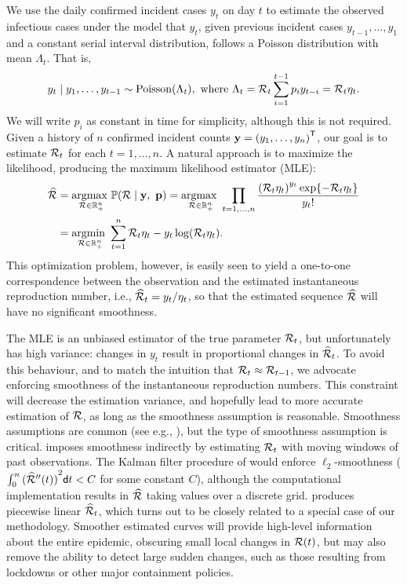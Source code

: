 We use the daily confirmed incident cases $y_t$ on day $t$ to estimate the
observed infectious cases under the model that $y_t$, given previous incident
cases $y_{t-1},\ldots,y_1$ and a constant serial interval distribution, follows a
Poisson distribution with mean $\Lambda_t$. That is, 
\begin{equation}
  y_t \mid y_1,\ldots,y_{t-1} \sim \mathrm{Poisson}(\Lambda_t), \textrm{ where } 
  \Lambda_t =  \mathcal{R}_t\sum_{i=1}^{t-1}p_i y_{t-i} = \mathcal{R}_t\eta_t.
\end{equation} 
We will write $p_i$ as constant in time for simplicity, although this is not
required. Given a history of $n$ confirmed incident counts $\mathbf{y} =
{(y_1,\ldots,y_n)}^{\mathsf{T}}$,
our goal is to estimate $\mathcal{R}_t$ for each $t=1,\ldots,n$. A natural approach is to maximize the
likelihood, producing the maximum likelihood estimator (MLE):
\begin{equation} \label{eq:mle}
  \begin{split}
    \widehat{\mathcal{R}} &= \underset{\mathcal{R} \in \mathbb{R}_+^n}{\operatorname*{argmax}\ } \mathbb{P}(\mathcal{R} \mid \mathbf{y},\ \mathbf{p})
    = \underset{\mathcal{R} \in \mathbb{R}^n_+}{\operatorname*{argmax}\ } \prod_{t = 1,\dots,n} 
    \frac{\left(\mathcal{R}_t \eta_t\right)^{y_t} \exp\{- \mathcal{R}_t \eta_t\}  }{y_t!}\\
    &= \underset{\mathcal{R}\in\mathbb{R}^n_+}{\operatorname*{argmin}\ } \sum_{t = 1}^n \mathcal{R}_t\eta_t - 
    y_t\log(\mathcal{R}_t\eta_t).
  \end{split}
\end{equation}
This optimization problem, however, is easily seen to yield a one-to-one
correspondence between the observation and the estimated instantaneous reproduction
number, i.e.,
$\widehat{\mathcal{R}}_t = y_t / \eta_t$, so that the estimated sequence
$\widehat{\mathcal{R}}$ will have no significant smoothness.


The MLE is an unbiased estimator of the true parameter $\mathcal{R}_t$, but
unfortunately has high variance: changes in $y_t$ result in proportional changes
in $\widehat{\mathcal{R}}_t$. To avoid this behaviour, and to match the intuition that
$\mathcal{R}_t \approx \mathcal{R}_{t-1}$, we advocate enforcing smoothness of the
instantaneous reproduction numbers. This constraint will decrease the estimation
variance, and hopefully lead to more accurate estimation of $\mathcal{R}$, as long as
the smoothness assumption is reasonable. Smoothness assumptions are common (see
e.g., \cite{gostic2020practical,parag2021improved}), but the type of smoothness
assumption is critical. \citet{cori2013new} imposes smoothness
indirectly by estimating $\mathcal{R}_t$ with moving windows of past observations. The
Kalman filter procedure of \cite{parag2021improved} would enforce
$\ell_2$-smoothness ($\int_0^n {(\widehat{\mathcal{R}}''(t))}^{2}\mathsf{d} t < C$ for some
constant $C$), although the computational implementation results in
$\widehat{\mathcal{R}}$ taking values over a discrete grid. \citet{pascal2022nonsmooth} produces piecewise linear $\widehat{\mathcal{R}}_t$,
which turns out to be closely related to a special case of our methodology.
Smoother estimated curves will provide high-level information about the entire
epidemic, obscuring small local changes in $\mathcal{R}(t)$, but may also remove the
ability to detect large sudden changes, such as those resulting from lockdowns
or other major containment policies. 

